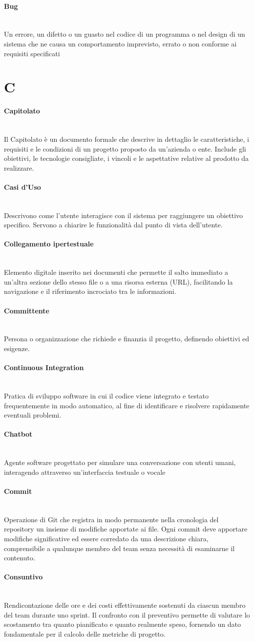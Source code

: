 \documentclass[a4paper, 10pt, colorlinks=true, linkcolor=black, urlcolor=blue, citecolor=blue, hidelinks]{article}
\newcommand{\glossaryterm}[2]{
    \paragraph{#1 \label{term:#1}} \mbox{} \\
    #2
    \vspace{0.5em}
}
\begin{document}
\glossaryterm{Bug}{Un errore, un difetto o un guasto nel codice di un programma o nel design di un sistema che ne causa un comportamento imprevisto, errato o non conforme ai requisiti specificati}

\newpage

\section*{C}

\glossaryterm{Capitolato}{Il Capitolato è un documento formale che descrive in dettaglio le caratteristiche, i requisiti e le condizioni di un progetto proposto da un'azienda o ente. Include gli obiettivi, le tecnologie consigliate, i vincoli e le aspettative relative al prodotto da realizzare.}

\glossaryterm{Casi d'Uso}{Descrivono come l'utente interagisce con il sistema per raggiungere un obiettivo specifico. Servono a chiarire le funzionalità dal punto di vista dell'utente.}

\glossaryterm{Collegamento ipertestuale}{Elemento digitale inserito nei documenti che permette il salto immediato a un'altra sezione dello stesso file o a una risorsa esterna (URL), facilitando la navigazione e il riferimento incrociato tra le informazioni.}

\glossaryterm{Committente}{Persona o organizzazione che richiede e finanzia il progetto, definendo obiettivi ed esigenze.}

\glossaryterm{Continuous Integration}{Pratica di sviluppo software in cui il codice viene integrato e testato frequentemente in modo automatico, al fine di identificare e risolvere rapidamente eventuali problemi.}

\glossaryterm{Chatbot}{Agente software progettato per simulare una conversazione con utenti umani, interagendo attraverso un'interfaccia testuale o vocale}

\glossaryterm{Commit}{Operazione di Git che registra in modo permanente nella cronologia del repository un insieme di modifiche apportate ai file. Ogni commit deve apportare modifiche significative ed essere corredato da una descrizione chiara, comprensibile a qualunque membro del team senza necessità di esaminarne il contenuto.}

\glossaryterm{Consuntivo}{Rendicontazione delle ore e dei costi effettivamente sostenuti da ciascun membro del team durante uno sprint. Il confronto con il preventivo permette di valutare lo scostamento tra quanto pianificato e quanto realmente speso, fornendo un dato fondamentale per il calcolo delle metriche di progetto.}
\end{document}
